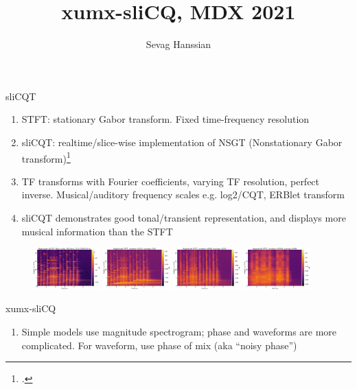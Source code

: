 \documentclass[final]{beamer}
\title{xumx-sliCQ, MDX 2021}
\author{Sevag Hanssian}
\institute{McGill University}
\begin{document}
  \begin{frame}{} 
    \begin{block}{sliCQT}
	  \begin{enumerate}
		  \item
			  STFT: stationary Gabor transform. Fixed time-frequency resolution
		  \item
			  sliCQT: realtime/slice-wise implementation of NSGT (Nonstationary Gabor transform)\footcite{slicq, balazs}
		  \item
			  TF transforms with Fourier coefficients, varying TF resolution, perfect inverse. Musical/auditory frequency scales e.g. log2/CQT, ERBlet transform
		  \item
			  sliCQT demonstrates good tonal/transient representation, and displays more musical information than the STFT
	  \end{enumerate}
    \end{block}
	  \begin{figure}
		  \centering
		  \includegraphics[width=0.23\textwidth]{./images-poster/slicq.png}
		  \includegraphics[width=0.23\textwidth]{./images-poster/stft_small.png}
		  \includegraphics[width=0.23\textwidth]{./images-poster/stft.png}
		  \includegraphics[width=0.23\textwidth]{./images-poster/stft_big.png}
	  \end{figure}
	\begin{block}{xumx-sliCQ}
	  \begin{enumerate}
		  \item
			  Simple models use magnitude spectrogram; phase and waveforms are more complicated. For waveform, use phase of mix (aka ``noisy phase'')

\end{enumerate}
\end{block}
\end{frame}
\end{document}
